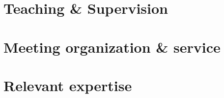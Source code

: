 \documentclass[12pt, letterpaper]{hunt-cv}
\begin{document}
\section*{Teaching \& Supervision}


\section*{Meeting organization \& service}
 

\section*{Relevant expertise}

\end{document}
